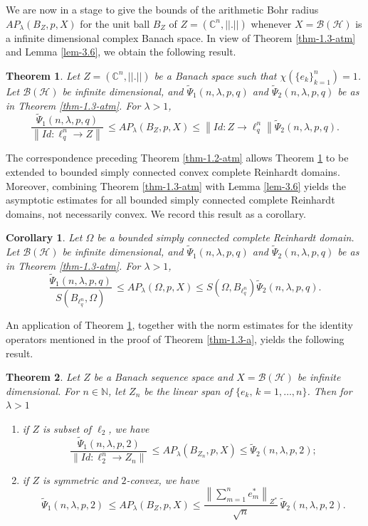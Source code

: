 \documentclass[a4paper,11pt, reqno]{amsart}
\newtheorem{thm}{Theorem}[section]
\newtheorem{cor}{Corollary}[section]
\theoremstyle{definition}
\newcommand{\norm}[1]{\left\lVert#1\right\rVert}
\begin{document}
	We are now in a stage to give the bounds of the arithmetic Bohr radius $AP_{\lambda}(B_{Z}, p,X)$ for the unit ball $B_{Z}$ of $Z=(\mathbb{C}^n,||.||)$ whenever $X=\mathcal{B}(\mathcal{H})$ is a infinite dimensional complex Banach space. In view of Theorem \ref{thm-1.3-atm} and Lemma \ref{lem-3.6}, we obtain the following result.
	\begin{thm} \label{thm-1.4-atm}
		Let $Z=(\mathbb{C}^n, ||.||)$ be a Banach space such that $\chi(\{e_k\}^n_{k=1})=1$. Let $\mathcal{B}(\mathcal{H})$ be infinite dimensional, and $\tilde{\Psi}_{1}(n,\lambda,p,q)$ and $\tilde{\Psi}_{2}(n,\lambda,p,q)$ be as in Theorem \ref{thm-1.3-atm}. For $\lambda>1$, 
		$$\frac{\tilde{\Psi}_{1}(n,\lambda,p,q)}{\norm{Id: \ell^n_{q} \rightarrow Z}} \, \leq AP_{\lambda}(B_{Z}, p,X) \leq \norm{Id: Z \rightarrow \ell^n_{q}} \tilde{\Psi}_{2}(n,\lambda,p,q).
		$$
	\end{thm}
The correspondence preceding Theorem \ref{thm-1.2-atm} allows Theorem \ref{thm-1.4-atm} to be extended to bounded simply connected convex complete Reinhardt domains. Moreover, combining Theorem \ref{thm-1.3-atm} with Lemma \ref{lem-3.6} yields the asymptotic estimates for all bounded simply connected complete Reinhardt domains, not necessarily convex. We record this result as a corollary.
\begin{cor} \label{cor-1.4-atm}
	Let $\Omega$ be a bounded simply connected complete Reinhardt domain. Let $\mathcal{B}(\mathcal{H})$ be infinite dimensional, and $\tilde{\Psi}_{1}(n,\lambda,p,q)$ and $\tilde{\Psi}_{2}(n,\lambda,p,q)$ be as in Theorem \ref{thm-1.3-atm}. For $\lambda>1$, 
	$$\frac{\tilde{\Psi}_{1}(n,\lambda,p,q)}{S(B_{\ell^n _q},\Omega)} \, \leq AP_{\lambda}(\Omega, p,X) \leq S(\Omega,B_{\ell^n _q}) \tilde{\Psi}_{2}(n,\lambda,p,q).
	$$
\end{cor}
An application of Theorem \ref{thm-1.4-atm}, together with the norm estimates for the identity operators mentioned in the proof of Theorem \ref{thm-1.3-a}, yields the following result.
	\begin{thm} \label{thm-1.6}
		Let $Z$ be a Banach sequence space and $X=\mathcal{B}(\mathcal{H})$ be infinite dimensional. For $n\in \mathbb{N}$, let $Z_{n}$ be the linear span of $\{e_{k}, \, k=1,\ldots,n\}$. Then for $\lambda>1$
		\begin{enumerate}
			\item if $Z$ is subset of $\ell_2$, we have 
			$$\frac{\tilde{\Psi}_{1}(n,\lambda,p,2)}{\norm{Id: \ell^n_{2} \rightarrow Z_n}} \, \leq AP_{\lambda}(B_{Z_n}, p,X) \leq  \tilde{\Psi}_{2}(n,\lambda,p,2);
			$$
			\item if $Z$ is symmetric and $2$-convex, we have $$\tilde{\Psi}_{1}(n,\lambda,p,2)\, \leq AP_{\lambda}(B_{Z}, p,X) \leq  \frac{\norm{\sum_{m=1}^{n}e^{*}_{m}}_{Z^{*}}}{\sqrt{n}}\, \tilde{\Psi}_{2}(n,\lambda,p,2).
			$$
		\end{enumerate}
	\end{thm}
\end{document}
